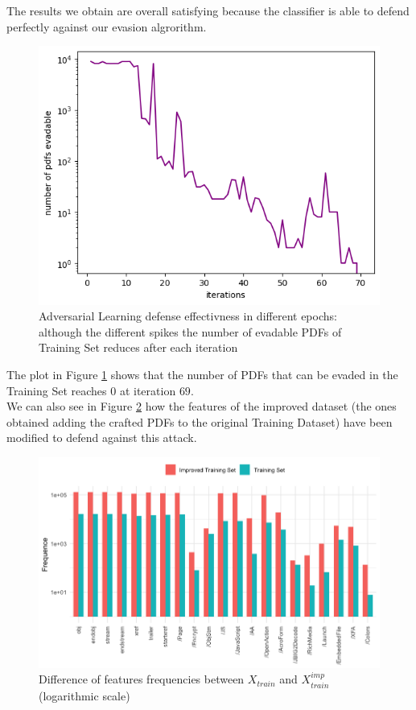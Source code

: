 \documentclass[twocolumn, switch]{article} %
\newcommand\x{0.7}
\begin{document}
The results we obtain are overall satisfying because the classifier is able to defend perfectly against our evasion algrorithm.

\begin{figure}[ht!]
	\centering
	\includegraphics[width=\x\linewidth]{adv_learning.png}
	\caption{Adversarial Learning defense effectivness in different epochs: although the different spikes the number of evadable PDFs of Training Set reduces after each iteration}
	\label{fig:advlearn}
\end{figure}
The plot in Figure \ref{fig:advlearn} shows that the number of PDFs that can be evaded in the Training Set reaches $0$ at iteration $69$.\\
We can also see in Figure \ref{fig:improved} how the features of the improved dataset (the ones obtained adding the crafted PDFs to the original Training Dataset) have been modified to defend against this attack.

\begin{figure}[ht!]
	\centering
	\includegraphics[width=\x\linewidth]{hist_train_improved.png}
	\caption{Difference of features frequencies between $X_{train}$ and $X_{train}^{imp}$ (logarithmic scale)}
	\label{fig:improved}
\end{figure}
\end{document}

